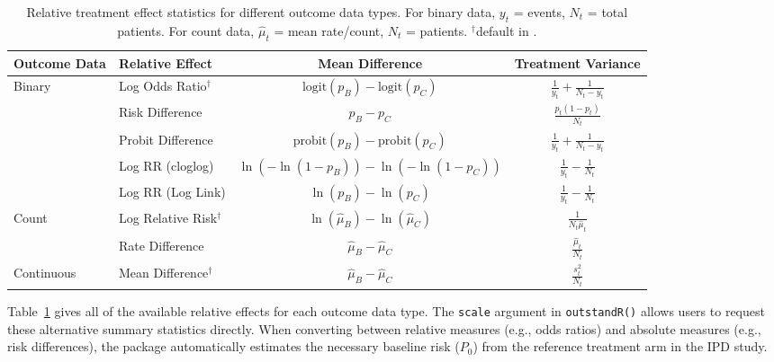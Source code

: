 \documentclass[article]{jss}
\begin{document}
\begin{table}[!ht]
    \centering
    \renewcommand{\arraystretch}{2.2}
    \begin{tabular}{@{} l l c c @{}}
        \toprule
        \textbf{Outcome Data} & \textbf{Relative Effect} & \textbf{Mean Difference} & \textbf{Treatment Variance} \\
        \midrule
        Binary 
          & Log Odds Ratio$^\dagger$ & $\text{logit}(p_B) - \text{logit}(p_C)$ & $\frac{1}{y_t} + \frac{1}{N_t - y_t}$ \\
          & Risk Difference & $p_B - p_C$ & $\frac{p_t(1 - p_t)}{N_t}$ \\
          & Probit Difference & $\text{probit}(p_B) - \text{probit}(p_C)$ & $\frac{1}{y_t} + \frac{1}{N_t - y_t}$ \\
          & Log RR (cloglog) & $\ln(-\ln(1 - p_B)) - \ln(-\ln(1 - p_C))$ & $\frac{1}{y_t} - \frac{1}{N_t}$ \\
          & Log RR (Log Link) & $\ln(p_B) - \ln(p_C)$ & $\frac{1}{y_t} - \frac{1}{N_t}$ \\
        Count 
          & Log Relative Risk$^\dagger$ & $\ln(\hat{\mu}_B) - \ln(\hat{\mu}_C)$ & $\frac{1}{N_t \hat{\mu}_t}$ \\
          & Rate Difference & $\hat{\mu}_B - \hat{\mu}_C$ & $\frac{\hat{\mu}_t}{N_t}$ \\
        Continuous 
          & Mean Difference$^\dagger$ & $\hat{\mu}_B - \hat{\mu}_C$ & $\frac{s_t^2}{N_t}$ \\
        \bottomrule
    \end{tabular}
    \caption{Relative treatment effect statistics for different outcome data types. For binary data, $y_t$ = events, $N_t$ = total patients. For count data, $\hat{\mu}_t$ = mean rate/count, $N_t$ = patients. $^\dagger$default in .}
        \label{tab:releff}
\end{table}

Table~\ref{tab:releff} gives all of the available relative effects for each outcome data type. The \texttt{scale} argument in \texttt{outstandR()} allows users to request these alternative summary statistics directly. 
When converting between relative measures (e.g., odds ratios) and absolute measures (e.g., risk differences), the package automatically estimates the necessary baseline risk ($P_0$) from the reference treatment arm in the IPD study.
\end{document}
